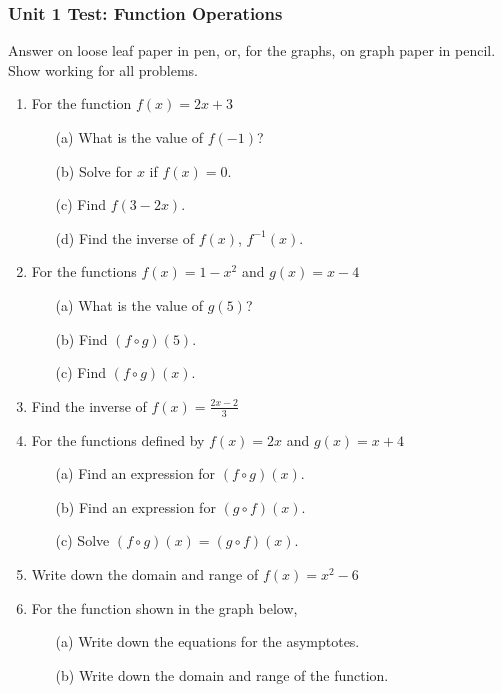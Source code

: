 \documentclass[12pt, oneside]{article}
\begin{document}
\subsubsection*{Unit 1 Test: Function Operations}
Answer on loose leaf paper in pen, or, for the graphs, on graph paper in pencil. Show working for all problems. %
  \vspace{0.5cm}
  \begin{enumerate}

    \item For the function $f(x) = 2x+3$
    \begin{itemize}
        \item[(a)] What is the value of $f(-1)$?
    	\item[(b)] Solve for $x$ if $f(x)=0$.
    	\item[(c)] Find  $f(3-2x)$.
    	\item[(d)] Find the inverse of $f(x)$,  $f^{-1}(x)$.
    \end{itemize}

    \item For the functions $f(x) = 1-x^2$ and $g(x) = x-4$
    \begin{itemize}
        \item[(a)] What is the value of $g(5)$?
    	\item[(b)] Find $(f\circ g)(5)$.
    	\item[(c)] Find $(f\circ g)(x)$.
    \end{itemize}

    \item Find the inverse of $\displaystyle f(x)= \frac {2x-2}{3}$

    \item For the functions defined by $f(x) = 2x$ and $g(x) = x+4$
    \begin{itemize}
        \item[(a)] Find an expression for $(f\circ g)(x)$.
    	\item[(b)] Find an expression for $(g\circ f)(x)$.
    	\item[(c)] Solve $(f\circ g)(x)=(g\circ f)(x)$.
    \end{itemize}

    \item Write down the domain and range of $f(x)= x^2-6$

    \item For the function shown in the graph below,
    \begin{itemize}
      \item[(a)] Write down the equations for the asymptotes.
    	\item[(b)] Write down the domain and range of the function.
    \end{itemize}



\end{enumerate}
\end{document}
